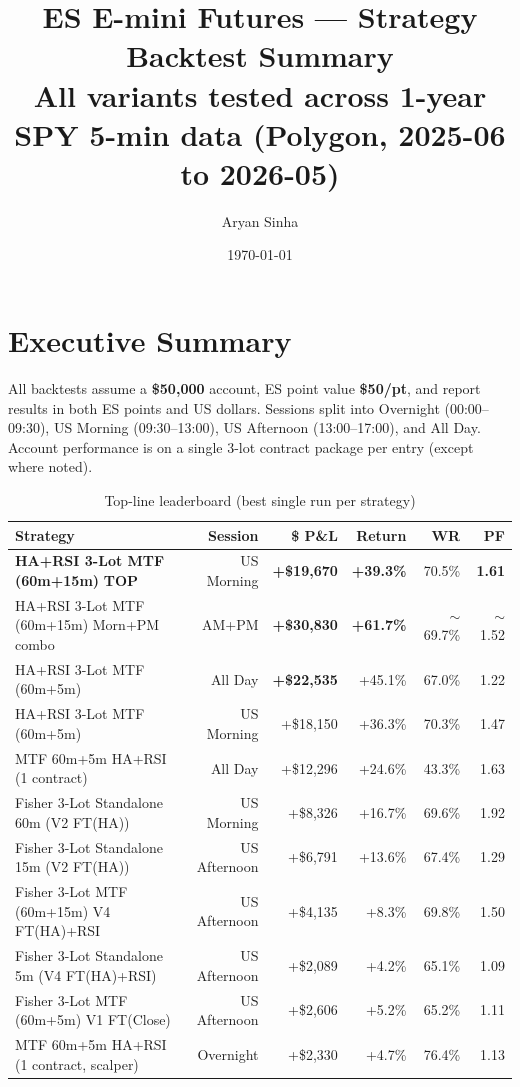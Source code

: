 \documentclass[11pt]{article}
\title{\textbf{ES E-mini Futures --- Strategy Backtest Summary}\\
\large All variants tested across 1-year SPY 5-min data (Polygon, 2025-06 to 2026-05)}
\author{Aryan Sinha}
\date{\today}
\newcommand{\pos}[1]{\textcolor{posgreen}{\textbf{#1}}}
\begin{document}
\maketitle

\section*{Executive Summary}

All backtests assume a \textbf{\$50{,}000} account, ES point value \textbf{\$50/pt}, and report results in both ES points and US dollars. Sessions split into Overnight (00:00--09:30), US Morning (09:30--13:00), US Afternoon (13:00--17:00), and All Day. Account performance is on a single 3-lot contract package per entry (except where noted).

\begin{table}[h!]
\centering
\caption*{Top-line leaderboard (best single run per strategy)}
\small
\begin{tabular}{lrrrrr}
\toprule
Strategy & Session & \$ P\&L & Return & WR & PF \\
\midrule
\pos{HA+RSI 3-Lot MTF (60m+15m)} \pos{TOP}      & US Morning   & \pos{+\$19{,}670} & \pos{+39.3\%} & 70.5\% & \pos{1.61} \\
HA+RSI 3-Lot MTF (60m+15m) Morn+PM combo        & AM+PM        & \pos{+\$30{,}830} & \pos{+61.7\%} & $\sim$69.7\% & $\sim$1.52 \\
HA+RSI 3-Lot MTF (60m+5m)                       & All Day      & \pos{+\$22{,}535} & +45.1\% & 67.0\% & 1.22 \\
HA+RSI 3-Lot MTF (60m+5m)                       & US Morning   & +\$18{,}150 & +36.3\% & 70.3\% & 1.47 \\
MTF 60m+5m HA+RSI (1 contract)                  & All Day      & +\$12{,}296 & +24.6\% & 43.3\% & 1.63 \\
Fisher 3-Lot Standalone 60m (V2 FT(HA))         & US Morning   & +\$8{,}326  & +16.7\% & 69.6\% & 1.92 \\
Fisher 3-Lot Standalone 15m (V2 FT(HA))         & US Afternoon & +\$6{,}791  & +13.6\% & 67.4\% & 1.29 \\
Fisher 3-Lot MTF (60m+15m) V4 FT(HA)+RSI        & US Afternoon & +\$4{,}135  & +8.3\%  & 69.8\% & 1.50 \\
Fisher 3-Lot Standalone 5m (V4 FT(HA)+RSI)      & US Afternoon & +\$2{,}089  & +4.2\%  & 65.1\% & 1.09 \\
Fisher 3-Lot MTF (60m+5m) V1 FT(Close)          & US Afternoon & +\$2{,}606  & +5.2\%  & 65.2\% & 1.11 \\
MTF 60m+5m HA+RSI (1 contract, scalper)         & Overnight    & +\$2{,}330  & +4.7\%  & 76.4\% & 1.13 \\
\bottomrule
\end{tabular}
\end{table}
\end{document}
